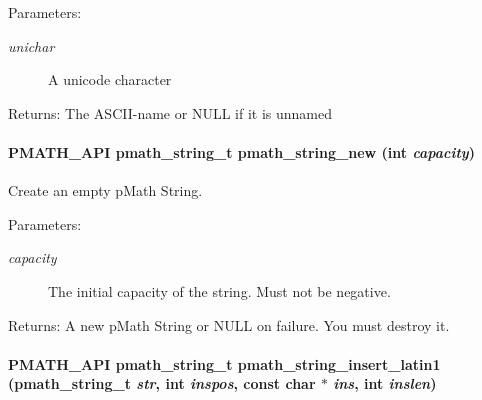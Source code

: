 \begin{Desc}
\item[Parameters:]
\begin{description}
\item[{\em unichar}]A unicode character \end{description}
\end{Desc}
\begin{Desc}
\item[Returns:]The ASCII-name or NULL if it is unnamed \end{Desc}
\hypertarget{group__strings_g9f860fe571fcb87515b82ddc704c93ef}{
\paragraph[{pmath\_\-string\_\-new}]{\setlength{\rightskip}{0pt plus 5cm}PMATH\_\-API {\bf pmath\_\-string\_\-t} pmath\_\-string\_\-new (int {\em capacity})}\hfill}
\label{group__strings_g9f860fe571fcb87515b82ddc704c93ef}


Create an empty pMath String. 

\begin{Desc}
\item[Parameters:]
\begin{description}
\item[{\em capacity}]The initial capacity of the string. Must not be negative. \end{description}
\end{Desc}
\begin{Desc}
\item[Returns:]A new pMath String or NULL on failure. You must destroy it. \end{Desc}
\hypertarget{group__strings_g0016e7daa5ca421a48b6d8bd3c5f7ff5}{
\paragraph[{pmath\_\-string\_\-insert\_\-latin1}]{\setlength{\rightskip}{0pt plus 5cm}PMATH\_\-API {\bf pmath\_\-string\_\-t} pmath\_\-string\_\-insert\_\-latin1 ({\bf pmath\_\-string\_\-t} {\em str}, \/  int {\em inspos}, \/  const char $\ast$ {\em ins}, \/  int {\em inslen})}\hfill}
\label{group__strings_g0016e7daa5ca421a48b6d8bd3c5f7ff5}


